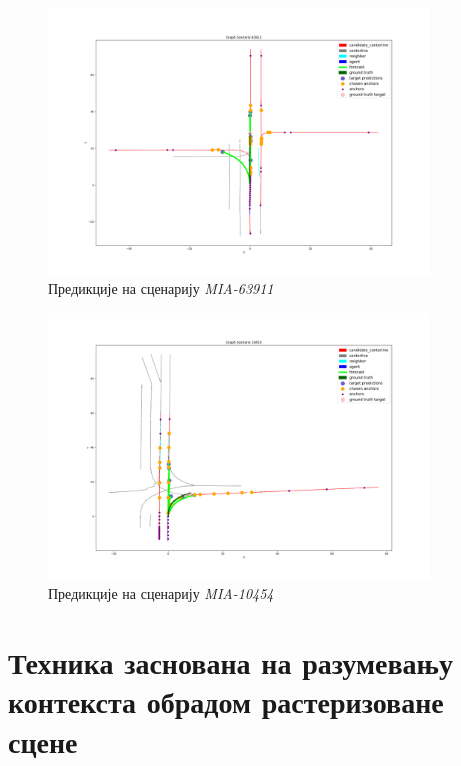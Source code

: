 \documentclass[11pt,oneside]{memoir}
\begin{document}
\begin{figure}[H]
  \centering
  \includegraphics[width=0.9\textwidth]{images/result_MIA_63911.png}
  \caption{Предикције на сценарију \textit{MIA-63911} \label{tnt-MIA-63911}}
\end{figure}

\begin{figure}[H]
  \centering
  \includegraphics[width=0.9\textwidth]{images/result_MIA_10454.png}
  \caption{Предикције на сценарију \textit{MIA-10454} \label{tnt-MIA-10454}}
\end{figure}

\chapter{Техника заснована на разумевању контекста обрадом растеризоване сцене}
\label{chp:razrada}
\end{document}
